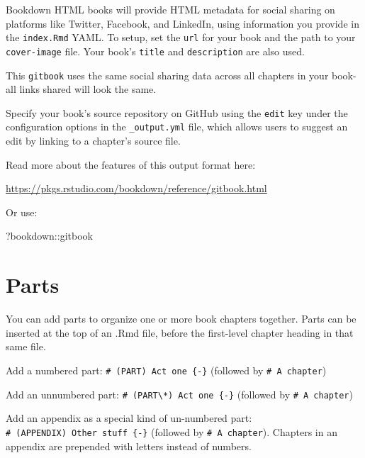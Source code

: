 \documentclass[
]{book}
\newenvironment{Shaded}{\begin{snugshade}}{\end{snugshade}}
\newcommand{\NormalTok}[1]{#1}
\newcommand{\SpecialCharTok}[1]{\textcolor[rgb]{0.00,0.00,0.00}{#1}}
\theoremstyle{definition}
\theoremstyle{definition}
\theoremstyle{definition}
\theoremstyle{definition}
\theoremstyle{remark}
\begin{document}
Bookdown HTML books will provide HTML metadata for social sharing on platforms like Twitter, Facebook, and LinkedIn, using information you provide in the \texttt{index.Rmd} YAML. To setup, set the \texttt{url} for your book and the path to your \texttt{cover-image} file. Your book's \texttt{title} and \texttt{description} are also used.

This \texttt{gitbook} uses the same social sharing data across all chapters in your book- all links shared will look the same.

Specify your book's source repository on GitHub using the \texttt{edit} key under the configuration options in the \texttt{\_output.yml} file, which allows users to suggest an edit by linking to a chapter's source file.

Read more about the features of this output format here:

\url{https://pkgs.rstudio.com/bookdown/reference/gitbook.html}

Or use:

\begin{Shaded}
\begin{Highlighting}[]
\NormalTok{?bookdown}\SpecialCharTok{::}\NormalTok{gitbook}
\end{Highlighting}
\end{Shaded}

\hypertarget{parts}{%
\chapter{Parts}\label{parts}}

You can add parts to organize one or more book chapters together. Parts can be inserted at the top of an .Rmd file, before the first-level chapter heading in that same file.

Add a numbered part: \texttt{\#\ (PART)\ Act\ one\ \{-\}} (followed by \texttt{\#\ A\ chapter})

Add an unnumbered part: \texttt{\#\ (PART\textbackslash{}*)\ Act\ one\ \{-\}} (followed by \texttt{\#\ A\ chapter})

Add an appendix as a special kind of un-numbered part: \texttt{\#\ (APPENDIX)\ Other\ stuff\ \{-\}} (followed by \texttt{\#\ A\ chapter}). Chapters in an appendix are prepended with letters instead of numbers.

  
\end{document}
